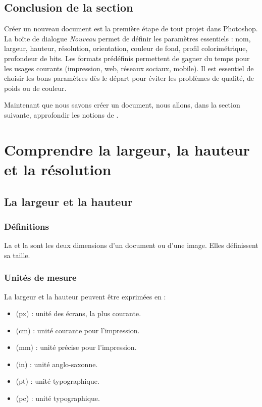\subsection*{Conclusion de la section}

Créer un nouveau document est la première étape de tout projet dans Photoshop. La boîte de dialogue \emph{Nouveau} permet de définir les paramètres essentiels : nom, largeur, hauteur, résolution, orientation, couleur de fond, profil colorimétrique, profondeur de bits. Les formats prédéfinis permettent de gagner du temps pour les usages courants (impression, web, réseaux sociaux, mobile). Il est essentiel de choisir les bons paramètres dès le départ pour éviter les problèmes de qualité, de poids ou de couleur.

Maintenant que nous savons créer un document, nous allons, dans la section suivante, approfondir les notions de .

\section{Comprendre la largeur, la hauteur et la résolution}

\subsection{La largeur et la hauteur}

\subsubsection{Définitions}

La  et la  sont les deux dimensions d'un document ou d'une image. Elles définissent sa taille.

\subsubsection{Unités de mesure}

La largeur et la hauteur peuvent être exprimées en :

\begin{itemize}
    \item {} (px) : unité des écrans, la plus courante.
    \item {} (cm) : unité courante pour l'impression.
    \item {} (mm) : unité précise pour l'impression.
    \item {} (in) : unité anglo-saxonne.
    \item {} (pt) : unité typographique.
    \item {} (pc) : unité typographique.
\end{itemize}

